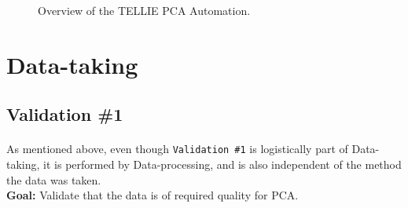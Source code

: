 \documentclass[12pt]{article}
\begin{document}
\begin{figure}
\centering
\noindent{}
  \caption{\centering Overview of the TELLIE PCA Automation.}
  \label{fig:overview}
\end{figure}

\section{Data-taking}
\subsection{Validation \#1}
\paragraph{}
As mentioned above, even though \texttt{Validation \#1} is logistically part of Data-taking, it is performed by Data-processing, and is also independent of the method the data was taken.\\
\textbf{Goal:} Validate that the data is of required quality for PCA.
\end{document}
